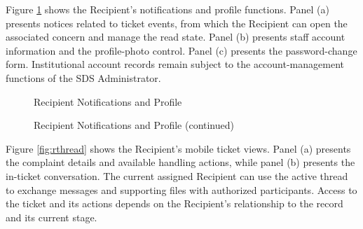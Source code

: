 Figure \ref{fig:rprofile} shows the Recipient's notifications and profile functions. Panel (a) presents notices related to ticket events, from which the Recipient can open the associated concern and manage the read state. Panel (b) presents staff account information and the profile-photo control. Panel (c) presents the password-change form. Institutional account records remain subject to the account-management functions of the SDS Administrator.

\renewcommand{\thefigure}{5.15}
\begin{figure}[htbp]
    \centering
    \begin{minipage}[t]{0.43\linewidth}
        \centering
        \vspace{0pt}
        \par{}\par
    \end{minipage}\hspace{0.04\linewidth}
    \begin{minipage}[t]{0.43\linewidth}
        \centering
        \vspace{0pt}
        \par{}\par
    \end{minipage}
    \caption{Recipient Notifications and Profile}
    \label{fig:rprofile}
\end{figure}
\FloatBarrier

\begin{figure}[htbp]
    \ContinuedFloat
    \centering
    \begin{minipage}[t]{0.43\linewidth}
        \centering
        \vspace{0pt}
        \par{}\par
    \end{minipage}
    \caption[]{Recipient Notifications and Profile (continued)}
\end{figure}
\FloatBarrier

Figure \ref{fig:rthread} shows the Recipient's mobile ticket views. Panel (a) presents the complaint details and available handling actions, while panel (b) presents the in-ticket conversation. The current assigned Recipient can use the active thread to exchange messages and supporting files with authorized participants. Access to the ticket and its actions depends on the Recipient's relationship to the record and its current stage.


